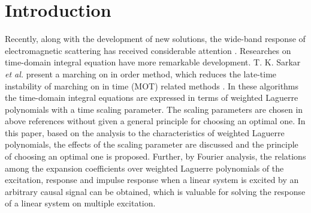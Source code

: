 \documentclass[conference, a4paper]{IEEEtran}
\begin{document}
%
\IEEEpeerreviewmaketitle



\section{Introduction}
Recently, along with the development of new solutions, the wide-band response of
electromagnetic scattering has received considerable attention
\cite{kashyap:stabilizing:1998,hujinlin:temporal:2001,jung:cfie:2002,jizhong:solving:2006}.
Researches
on time-domain integral equation have more remarkable development. T. K.
Sarkar {\em et al.} present a marching on in order method, which
reduces the late-time instability of marching on in time (MOT) related
methods \cite{jizhong:solving:2006,jung:accurate:2002,jung:analysis:2004,jung:time:2003}. In these algorithms the time-domain integral equations
are expressed in terms of weighted Laguerre polynomials with a time
scaling parameter. The scaling parameters are chosen in above references
without given a general principle for choosing an optimal one. In this
paper, based on the analysis to the characteristics of weighted Laguerre
polynomials, the effects of the scaling parameter are discussed and the
principle of choosing an optimal one is proposed. Further, by Fourier
analysis, the relations among the expansion coefficients over weighted Laguerre
polynomials of the excitation, response and impulse response when a
linear system is excited by an arbitrary causal signal can be obtained,
which is valuable for solving the response of a linear system on
multiple excitation.


%
\end{document}
